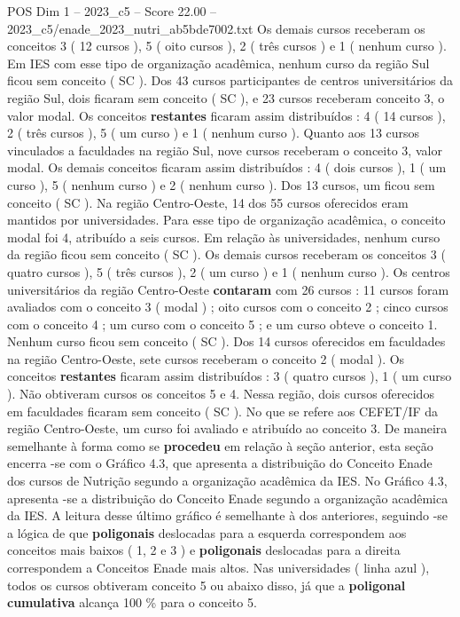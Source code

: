 \begin{textsample}{POS Dim 1 – 2023\_c5 – Score 22.00 – 2023\_c5/enade\_2023\_nutri\_ab5bde7002.txt}
Os demais cursos receberam os conceitos 3 ( 12 cursos ), 5 ( oito cursos ), 2 ( três cursos ) e 1 ( nenhum curso ).
Em IES com esse tipo de organização acadêmica, nenhum curso da região Sul ficou sem conceito ( SC ).
Dos 43 cursos participantes de centros universitários da região Sul, dois ficaram sem conceito ( SC ), e 23 cursos receberam conceito 3, o valor modal.
Os conceitos \textbf{restantes} ficaram assim distribuídos : 4 ( 14 cursos ), 2 ( três cursos ), 5 ( um curso ) e 1 ( nenhum curso ).
Quanto aos 13 cursos vinculados a faculdades na região Sul, nove cursos receberam o conceito 3, valor modal.
Os demais conceitos ficaram assim distribuídos : 4 ( dois cursos ), 1 ( um curso ), 5 ( nenhum curso ) e 2 ( nenhum curso ).
Dos 13 cursos, um ficou sem conceito ( SC ).
Na região Centro-Oeste, 14 dos 55 cursos oferecidos eram mantidos por universidades.
Para esse tipo de organização acadêmica, o conceito modal foi 4, atribuído a seis cursos.
Em relação às universidades, nenhum curso da região ficou sem conceito ( SC ).
Os demais cursos receberam os conceitos 3 ( quatro cursos ), 5 ( três cursos ), 2 ( um curso ) e 1 ( nenhum curso ).
Os centros universitários da região Centro-Oeste \textbf{contaram} com 26 cursos : 11 cursos foram avaliados com o conceito 3 ( modal ) ; oito cursos com o conceito 2 ; cinco cursos com o conceito 4 ; um curso com o conceito 5 ; e um curso obteve o conceito 1.
Nenhum curso ficou sem conceito ( SC ).
Dos 14 cursos oferecidos em faculdades na região Centro-Oeste, sete cursos receberam o conceito 2 ( modal ).
Os conceitos \textbf{restantes} ficaram assim distribuídos : 3 ( quatro cursos ), 1 ( um curso ).
Não obtiveram cursos os conceitos 5 e 4.
Nessa região, dois cursos oferecidos em faculdades ficaram sem conceito ( SC ).
No que se refere aos CEFET/IF da região Centro-Oeste, um curso foi avaliado e atribuído ao conceito 3.
De maneira semelhante à forma como se \textbf{procedeu} em relação à seção anterior, esta seção encerra -se com o Gráfico 4.3, que apresenta a distribuição do Conceito Enade dos cursos de Nutrição segundo a organização acadêmica da IES.
No Gráfico 4.3, apresenta -se a distribuição do Conceito Enade segundo a organização acadêmica da IES.
A leitura desse último gráfico é semelhante à dos anteriores, seguindo -se a lógica de que \textbf{poligonais} deslocadas para a esquerda correspondem aos conceitos mais baixos ( 1, 2 e 3 ) e \textbf{poligonais} deslocadas para a direita correspondem a Conceitos Enade mais altos.
Nas universidades ( linha azul ), todos os cursos obtiveram conceito 5 ou abaixo disso, já que a \textbf{poligonal} \textbf{cumulativa} alcança 100 \% para o conceito 5.

\end{textsample}
